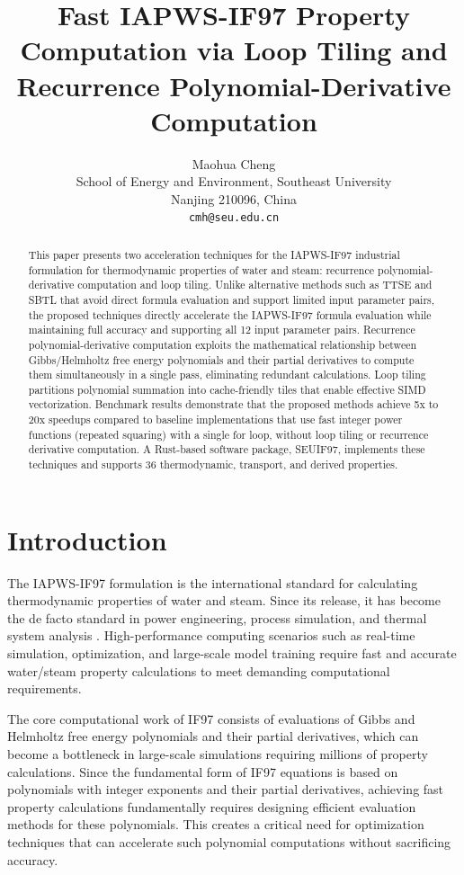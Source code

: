 \documentclass{article}
\title{Fast IAPWS-IF97 Property Computation via Loop Tiling and Recurrence Polynomial-Derivative Computation}
\author{Maohua Cheng \\
  School of Energy and Environment, Southeast University \\
  Nanjing 210096, China \\
  \texttt{cmh@seu.edu.cn}}
\date{}
\begin{document}
\maketitle

\begin{abstract}
This paper presents two acceleration techniques for the IAPWS-IF97 industrial formulation for thermodynamic properties of water and steam: recurrence polynomial-derivative computation and loop tiling. Unlike alternative methods such as TTSE and SBTL that avoid direct formula evaluation and support limited input parameter pairs, the proposed techniques directly accelerate the IAPWS-IF97 formula evaluation while maintaining full accuracy and supporting all 12 input parameter pairs. Recurrence polynomial-derivative computation exploits the mathematical relationship between Gibbs/Helmholtz free energy polynomials and their partial derivatives to compute them simultaneously in a single pass, eliminating redundant calculations. Loop tiling partitions polynomial summation into cache-friendly tiles that enable effective SIMD vectorization. Benchmark results demonstrate that the proposed methods achieve 5x to 20x speedups compared to baseline implementations that use fast integer power functions (repeated squaring) with a single for loop, without loop tiling or recurrence derivative computation. A Rust-based software package, SEUIF97, implements these techniques and supports 36 thermodynamic, transport, and derived properties.
\end{abstract}

\section{Introduction}

The IAPWS-IF97 formulation \cite{IAPWS-IF97} is the international standard for calculating thermodynamic properties of water and steam. Since its release, it has become the de facto standard in power engineering, process simulation, and thermal system analysis \cite{Wagner2008}. High-performance computing scenarios such as real-time simulation, optimization, and large-scale model training require fast and accurate water/steam property calculations to meet demanding computational requirements.

The core computational work of IF97 consists of evaluations of Gibbs and Helmholtz free energy polynomials and their partial derivatives, which can become a bottleneck in large-scale simulations requiring millions of property calculations. Since the fundamental form of IF97 equations is based on polynomials with integer exponents and their partial derivatives, achieving fast property calculations fundamentally requires designing efficient evaluation methods for these polynomials. This creates a critical need for optimization techniques that can accelerate such polynomial computations without sacrificing accuracy.
\end{document}
